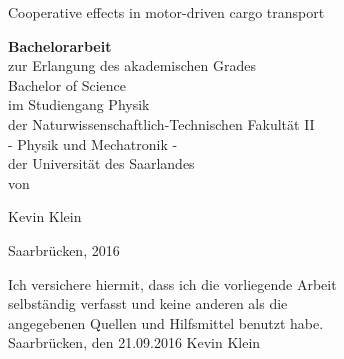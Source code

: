 


\pagestyle{empty} %

\clearscrheadings\clearscrplain
\begin{center}

\begin{bfseries}
\begin{Huge}
Cooperative effects in motor-driven cargo transport\\
\end{Huge}
\end{bfseries}
\vspace{4cm}
\textbf{Bachelorarbeit}\\
\vspace{0.4cm}
zur Erlangung des akademischen Grades\\ 
Bachelor of Science  \\
im Studiengang Physik \\
der Naturwissenschaftlich-Technischen Fakultät II \\
- Physik und Mechatronik -  \\
der Universität des Saarlandes \\
\vspace{4 cm}
von\\
\vspace{0.5cm}
\begin{Large}
Kevin Klein \\
\end{Large}
\vspace{1.5cm}
Saarbrücken, 2016


\end{center}
\clearpage

\newpage 
\thispagestyle{empty}
\quad  %
\newpage

\null\vfill
\begin{center}
Ich versichere hiermit, dass ich die vorliegende Arbeit \\
selbständig verfasst und keine anderen als die \\
angegebenen Quellen und Hilfsmittel benutzt habe.\\


\vspace{4cm}
Saarbrücken, den 21.09.2016 \hspace{4cm} Kevin Klein\\
\end{center}
\vfill

